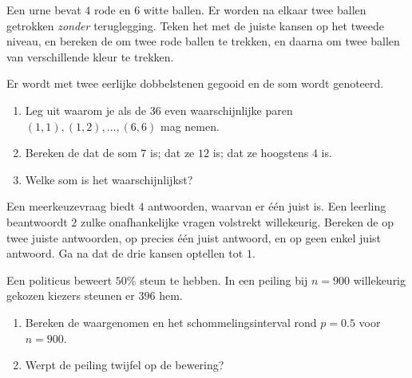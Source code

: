 \begin{exercise}[$\star\star$]\label{exo:g10:proba:5}
Een urne bevat $4$ rode en $6$ witte ballen. Er worden na elkaar twee ballen
getrokken \emph{zonder} teruglegging. Teken het  met de juiste
kansen op het tweede niveau, en bereken de  om twee rode ballen te
trekken, en daarna om twee ballen van verschillende kleur te trekken.
\end{exercise}

\begin{exercise}[$\star\star$]\label{exo:g10:proba:6}
Er wordt met twee eerlijke dobbelstenen gegooid en de som wordt genoteerd.
\begin{enumerate}
  \item Leg uit waarom je als  de $36$ even
        waarschijnlijke paren $(1,1), (1,2), \dots, (6,6)$ mag nemen.
  \item Bereken de  dat de som $7$ is; dat ze $12$ is; dat ze hoogstens
        $4$ is.
  \item Welke som is het waarschijnlijkst?
\end{enumerate}
\end{exercise}

\begin{exercise}[$\star\star$]\label{exo:g10:proba:7}
Een meerkeuzevraag biedt $4$ antwoorden, waarvan er één juist is. Een
leerling beantwoordt $2$ zulke onafhankelijke vragen volstrekt willekeurig.
Bereken de  op twee juiste antwoorden, op precies één juist antwoord, en
op geen enkel juist antwoord. Ga na dat de drie kansen optellen tot $1$.
\end{exercise}

\begin{exercise}[$\star\star$]\label{exo:g10:proba:8}
Een politicus beweert $50\%$ steun te hebben. In een peiling bij $n = 900$
willekeurig gekozen kiezers steunen er $396$ hem.
\begin{enumerate}
  \item Bereken de waargenomen  en het schommelingsinterval rond
        $p = 0.5$ voor $n = 900$.
  \item Werpt de peiling twijfel op de bewering?
\end{enumerate}
\end{exercise}


